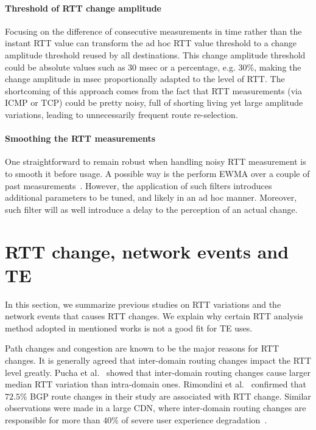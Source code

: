 \paragraph{Threshold of RTT change amplitude} Focusing on the difference of consecutive measurements in time rather than the instant RTT value can transform the ad hoc RTT value threshold to a change amplitude threshold reused by all destinations. 
This change amplitude threshold could be absolute values such as 30 msec or a percentage, e.g. $30\%$,  making the change amplitude in msec proportionally adapted to the level of RTT.
The shortcoming of this approach comes from the fact that RTT measurements (via ICMP or TCP) could be pretty noisy, full of shorting living yet large amplitude variations, leading to unnecessarily frequent route re-selection.

\paragraph{Smoothing the RTT measurements} One straightforward to remain robust when handling noisy RTT measurement is to smooth it before usage. A possible way is the perform \ac{EWMA} over a couple of past measurements~\cite{Akella2008}. However, the application of such filters introduces additional parameters to be tuned, and likely in an ad hoc manner. Moreover, such filter will as well introduce a delay to the perception of an actual change.


\section{RTT change, network events and TE}
\label{sec:rtt_path}
In this section, we summarize previous studies on RTT variations and the network events that causes RTT changes.
We explain why certain RTT analysis method adopted in mentioned works is not a good fit for TE uses.

Path changes and congestion are known to be the major reasons for RTT changes.
It is generally agreed that inter-domain routing changes impact the RTT level greatly.
Pucha et al.~\cite{Pucha2007} showed that inter-domain routing changes cause larger median RTT variation than intra-domain ones.
Rimondini et al.~\cite{Rimondini2014} confirmed that $72.5\%$ BGP route changes in their study are associated with RTT change.
Similar observations were made in a large \ac{CDN}, where inter-domain routing changes are responsible for more than $40\%$ of severe user experience degradation~\cite{Zhu2012}.

